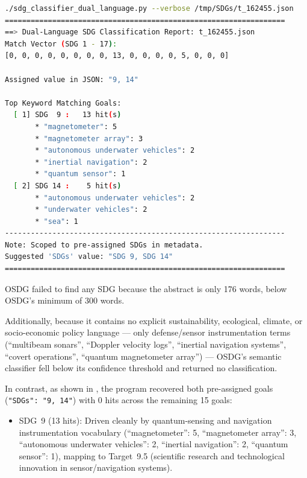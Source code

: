 \begin{casestudySection}
\begin{lstlisting}[language={bash}, basicstyle=\footnotesize, escapechar=|, breaklines=true,
    postbreak=\usebox{\lstbreakbox}, caption={Program's output}, label=lst:t_162455Output]
 ./sdg_classifier_dual_language.py --verbose /tmp/SDGs/t_162455.json
=================================================================
==> Dual-Language SDG Classification Report: t_162455.json
Match Vector (SDG 1 - 17):
[0, 0, 0, 0, 0, 0, 0, 0, 13, 0, 0, 0, 0, 5, 0, 0, 0]

Assigned value in JSON: "9, 14"

Top Keyword Matching Goals:
  [ 1] SDG  9 :   13 hit(s)
       * "magnetometer": 5
       * "magnetometer array": 3
       * "autonomous underwater vehicles": 2
       * "inertial navigation": 2
       * "quantum sensor": 1
  [ 2] SDG 14 :    5 hit(s)
       * "autonomous underwater vehicles": 2
       * "underwater vehicles": 2
       * "sea": 1
-----------------------------------------------------------------
Note: Scoped to pre-assigned SDGs in metadata.
Suggested 'SDGs' value: "SDG 9, SDG 14"
=================================================================
\end{lstlisting}

OSDG failed to find any \gls{SDG} because the abstract is only \num{176} words, below OSDG's minimum of \num{300} words.

Additionally, because it contains no explicit sustainability, ecological, climate, or socio-economic policy language --- only defense/sensor instrumentation terms (\enquote{multibeam sonars}, \enquote{Doppler velocity logs}, \enquote{inertial navigation systems}, \enquote{covert operations}, \enquote{quantum magnetometer array}) --- OSDG's semantic classifier fell below its confidence threshold and returned no classification.

In contrast, as shown in , the program recovered both pre-assigned goals (\texttt{"SDGs": "9, 14"}) with \num{0} hits across the remaining \num{15} goals:
\begin{itemize}
    \item \gls{SDG}~9 (\num{13} hits): Driven cleanly by quantum-sensing and navigation instrumentation vocabulary (\enquote{magnetometer}: 5, \enquote{magnetometer array}: 3, \enquote{autonomous underwater vehicles}: 2, \enquote{inertial navigation}: 2, \enquote{quantum sensor}: 1), mapping to Target~9.5 (scientific research and technological innovation in sensor/navigation systems).
    

\end{itemize}
\end{casestudySection}
